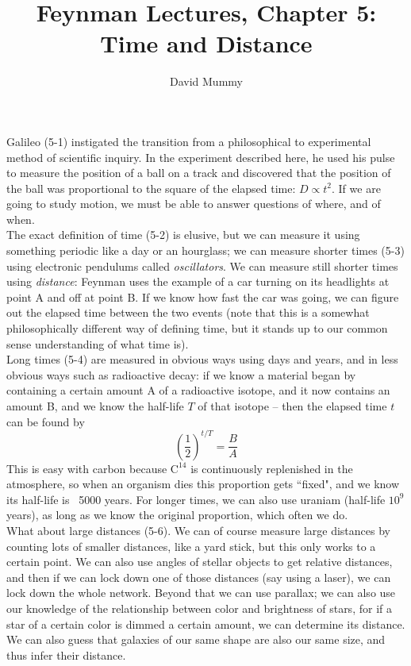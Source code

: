 \documentclass[10pt,letterpaper]{article}
\author{David Mummy}
\title{Feynman Lectures, Chapter 5: Time and Distance}
\begin{document}
\maketitle
Galileo (5-1) instigated the transition from a philosophical to experimental method of scientific inquiry. In the experiment described here, he used his pulse to measure the position of a ball on a track and discovered that the position of the ball was proportional to the square of the elapsed time: $D \propto t^2$. If we are going to study motion, we must be able to answer questions of where, and of when. \\
The exact definition of time (5-2) is elusive, but we can measure it using something periodic like a day or an hourglass; we can measure shorter times (5-3) using electronic pendulums called \textit{oscillators}. We can measure still shorter times using \textit{distance}: Feynman uses the example of a car turning on its headlights at point A and off at point B. If we know how fast the car was going, we can figure out the elapsed time between the two events (note that this is a somewhat philosophically different way of defining time, but it stands up to our common sense understanding of what time is). \\
\indent Long times (5-4) are measured in obvious ways using days and years, and in less obvious ways such as radioactive decay: if we know a material began by containing a certain amount A of a radioactive isotope, and it now contains an amount B, and we know the half-life $T$ of that isotope -- then the elapsed time $t$ can be found by 
$$ \left(\frac{1}{2}\right)^{t/T} = \frac{B}{A} $$
This is easy with carbon because $\textrm{C}^{14}$ is continuously replenished in the atmosphere, so when an organism dies this proportion gets ``fixed", and we know its half-life is ~5000 years. For longer times, we can also use uraniam (half-life $10^9$ years), as long as we know the original proportion, which often we do.\\
\indent What about large distances (5-6). We can of course measure large distances by counting lots of smaller distances, like a yard stick, but this only works to a certain point. We can also use angles of stellar objects to get relative distances, and then if we can lock down one of those distances (say using a laser), we can lock down the whole network. Beyond that we can use parallax; we can also use our knowledge of the relationship between color and brightness of stars, for if a star of a certain color is dimmed a certain amount, we can determine its distance. We can also guess that galaxies of our same shape are also our same size, and thus infer their distance. \\
\end{document}
